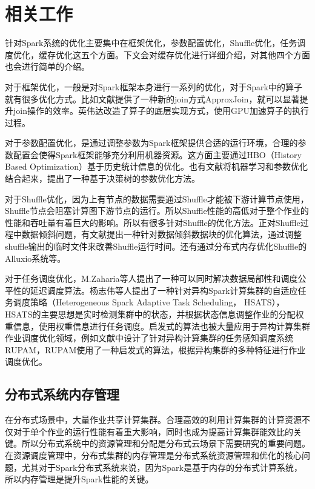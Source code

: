 \section{相关工作}
针对Spark系统的优化主要集中在框架优化，参数配置优化，Shuffle优化，任务调度优化，缓存优化这五个方面。下文会对缓存优化进行详细介绍，对其他四个方面也会进行简单的介绍。

对于框架优化，一般是对Spark框架本身进行一系列的优化，对于Spark中的算子就有很多优化方式。比如文献提供了一种新的join方式ApproxJoin，就可以显著提升join操作的效率。英伟达改造了算子的底层实现方式，使用GPU加速算子的执行过程。

对于参数配置优化，是通过调整参数为Spark框架提供合适的运行环境，合理的参数配置会使得Spark框架能够充分利用机器资源。这方面主要通过HBO（History Based Optimization）基于历史统计信息的优化。也有文献将机器学习和参数优化结合起来，提出了一种基于决策树的参数优化方法。

对于Shuffle优化，因为上有节点的数据需要通过Shuffle才能被下游计算节点使用，Shuffle节点会阻塞计算图下游节点的运行。所以Shuffle性能的高低对于整个作业的性能和吞吐量有着巨大的影响。所以有很多针对Shuffle的优化方法。正对Shuffle过程中数据倾斜问题，有文献提出一种针对数据倾斜数据块的优化算法，通过调整shuffle输出的临时文件来改善Shuffle运行时间。还有通过分布式内存优化Shuffle的Alluxio系统等。

对于任务调度优化，M.Zaharia等人提出了一种可以同时解决数据局部性和调度公平性的延迟调度算法。杨志伟等人提出了一种针对异构Spark计算集群的自适应任务调度策略（Heterogeneous Spark Adaptive Task Scheduling， HSATS），HSATS的主要思想是实时检测集群中的状态，并根据状态信息调整作业的分配权重信息，使用权重信息进行任务调度。启发式的算法也被大量应用于异构计算集群作业调度优化领域，例如文献中设计了针对异构计算集群的任务感知调度系统RUPAM，RUPAM使用了一种启发式的算法，根据异构集群的多种特征进行作业调度优化。



\subsection{分布式系统内存管理}

在分布式场景中，大量作业共享计算集群。合理高效的利用计算集群的计算资源不仅对于单个作业的运行性能有着重大影响，同时也成为提高计算集群能效比的关键。所以分布式系统中的资源管理和分配是分布式云场景下需要研究的重要问题。在资源调度管理中，分布式集群的内存管理是分布式系统资源管理和优化的核心问题，尤其对于Spark分布式系统来说，因为Spark是基于内存的分布式计算系统，所以内存管理是提升Spark性能的关键。

